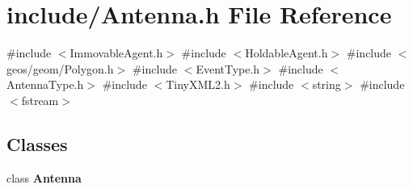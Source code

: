 \section{include/\+Antenna.h File Reference}
\label{_antenna_8h}
{\ttfamily \#include $<$Immovable\+Agent.\+h$>$}\newline
{\ttfamily \#include $<$Holdable\+Agent.\+h$>$}\newline
{\ttfamily \#include $<$geos/geom/\+Polygon.\+h$>$}\newline
{\ttfamily \#include $<$Event\+Type.\+h$>$}\newline
{\ttfamily \#include $<$Antenna\+Type.\+h$>$}\newline
{\ttfamily \#include $<$Tiny\+X\+M\+L2.\+h$>$}\newline
{\ttfamily \#include $<$string$>$}\newline
{\ttfamily \#include $<$fstream$>$}\newline
\subsection*{Classes}
\begin{DoxyCompactItemize}
\item 
class \textbf{ Antenna}
\end{DoxyCompactItemize}
